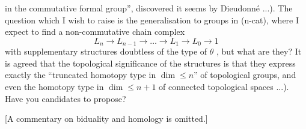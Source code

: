 
in the commutative formal group'', discovered it seems by Dieudonné
...). The question which I wish to raise is the generalisation to
groups in (n-cat), where I expect to find a non-commutative chain
complex
\[ L_n \to L_{n-1} \to \dots \to L_1 \to L_0 \to 1 \]
with supplementary structures doubtless of the type of $\theta$ , but
what are they? It is agreed that the topological significance of
the structures is that they express exactly the ``truncated homotopy
type in $\dim \leq n$'' of topological groups, and even the homotopy
type in $\dim \leq n+1$ of connected topological spaces ...). Have
you candidates to propose?

[A commentary on biduality and homology is omitted.]

